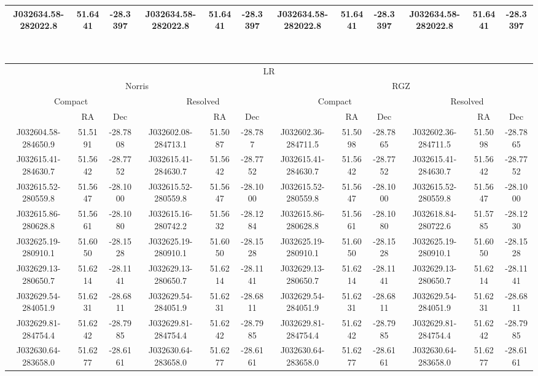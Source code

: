 \begin{table}
\begin{tabular}{cccccccccccc}
J032634.58-282022.8 & 51.6441 & -28.3397 & J032634.58-282022.8 & 51.6441 & -28.3397 & J032634.58-282022.8 & 51.6441 & -28.3397 & J032634.58-282022.8 & 51.6441 & -28.3397\\
      \hline\hline
    \end{tabular}\\
    \begin{tabular}{cccccccccccc}
      \hline\hline
\multicolumn{12}{c}{LR}\\
 \multicolumn{6}{c}{Norris} & \multicolumn{6}{c}{RGZ}\\
 \multicolumn{3}{c}{Compact} & \multicolumn{3}{c}{Resolved} & \multicolumn{3}{c}{Compact} & \multicolumn{3}{c}{Resolved} \\
  & RA & Dec & & RA & Dec & & RA & Dec & & RA & Dec \\
      \hline
J032604.58-284650.9 & 51.5191 & -28.7808 & J032602.08-284713.1 & 51.5087 & -28.787 & J032602.36-284711.5 & 51.5098 & -28.7865 & J032602.36-284711.5 & 51.5098 & -28.7865\\
J032615.41-284630.7 & 51.5642 & -28.7752 & J032615.41-284630.7 & 51.5642 & -28.7752 & J032615.41-284630.7 & 51.5642 & -28.7752 & J032615.41-284630.7 & 51.5642 & -28.7752\\
J032615.52-280559.8 & 51.5647 & -28.1000 & J032615.52-280559.8 & 51.5647 & -28.1000 & J032615.52-280559.8 & 51.5647 & -28.1000 & J032615.52-280559.8 & 51.5647 & -28.1000\\
J032615.86-280628.8 & 51.5661 & -28.1080 & J032615.16-280742.2 & 51.5632 & -28.1284 & J032615.86-280628.8 & 51.5661 & -28.1080 & J032618.84-280722.6 & 51.5785 & -28.1230\\
J032625.19-280910.1 & 51.6050 & -28.1528 & J032625.19-280910.1 & 51.6050 & -28.1528 & J032625.19-280910.1 & 51.6050 & -28.1528 & J032625.19-280910.1 & 51.6050 & -28.1528\\
J032629.13-280650.7 & 51.6214 & -28.1141 & J032629.13-280650.7 & 51.6214 & -28.1141 & J032629.13-280650.7 & 51.6214 & -28.1141 & J032629.13-280650.7 & 51.6214 & -28.1141\\
J032629.54-284051.9 & 51.6231 & -28.6811 & J032629.54-284051.9 & 51.6231 & -28.6811 & J032629.54-284051.9 & 51.6231 & -28.6811 & J032629.54-284051.9 & 51.6231 & -28.6811\\
J032629.81-284754.4 & 51.6242 & -28.7985 & J032629.81-284754.4 & 51.6242 & -28.7985 & J032629.81-284754.4 & 51.6242 & -28.7985 & J032629.81-284754.4 & 51.6242 & -28.7985\\
J032630.64-283658.0 & 51.6277 & -28.6161 & J032630.64-283658.0 & 51.6277 & -28.6161 & J032630.64-283658.0 & 51.6277 & -28.6161 & J032630.64-283658.0 & 51.6277 & -28.6161\\

\end{tabular}
\end{table}

